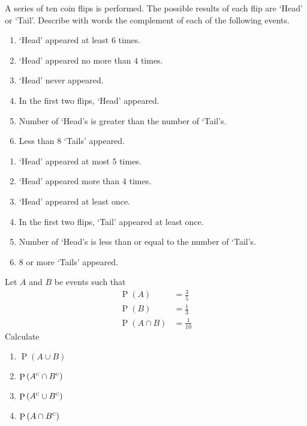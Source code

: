 \documentclass[fleqn, a4paper, 11pt, oneside]{amsart}
\theoremstyle{definition}
\theoremstyle{theorem}
\DeclareMathOperator{\comp}{\textsc{c}}
\DeclareMathOperator{\prob}{\mathrm{P}}
\begin{document}
\begin{question}
	A series of ten coin flips is performed.
	The possible results of each flip are `Head' or `Tail'.
	Describe with words the complement of each of the following events.
	\begin{enumerate}
		\item `Head' appeared at least $6$ times.
		\item `Head' appeared no more than $4$ times.
		\item `Head' never appeared.
		\item In the first two flips, `Head' appeared.
		\item Number of `Head's is greater than the number of `Tail's.
		\item Less than $8$ `Tails' appeared.
	\end{enumerate}
\end{question}

\begin{solution}
	\begin{enumerate}
		\item `Head' appeared at most $5$ times.
		\item `Head' appeared more than $4$ times.
		\item `Head' appeared at least once.
		\item In the first two flips, `Tail' appeared at least once.
		\item Number of `Head's is less than or equal to the number of `Tail's.
		\item $8$ or more `Tails' appeared.
	\end{enumerate}
\end{solution}

\begin{question}
	Let $A$ and $B$ be events such that
	\begin{align*}
		\prob(A)        & = \frac{3}{5} \\
		\prob(B)        & = \frac{1}{3} \\
		\prob(A \cap B) & = \frac{1}{10}
	\end{align*}
	Calculate
	\begin{enumerate}
		\item $\prob(A \cup B)$
		\item $\prob\left( A^{\comp} \cap B^{\comp} \right)$
		\item $\prob\left( A^{\comp} \cup B^{\comp} \right)$
		\item $\prob\left( A \cap B^{\comp} \right)$
	\end{enumerate}
\end{question}
\end{document}
